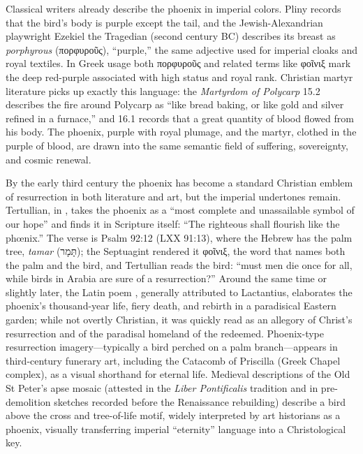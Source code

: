 Classical writers already describe the phoenix in imperial colors.
Pliny \cite[10.2]{pliny:nh} records that the bird's body is purple except the tail, and the Jewish-Alexandrian playwright Ezekiel the Tragedian (second century BC) \cite{ezekieldramatist:exagoge} describes its breast as \emph{porphyrous} (πορφυροῦς), ``purple,'' the same adjective used for imperial cloaks and royal textiles.
In Greek usage both πορφυροῦς and related terms like φοῖνιξ mark the deep red-purple associated with high status and royal rank.
Christian martyr literature picks up exactly this language: the \emph{Martyrdom of Polycarp} 15.2 describes the fire around Polycarp as ``like bread baking, or like gold and silver refined in a furnace,'' and 16.1 records that a great quantity of blood flowed from his body.
The phoenix, purple with royal plumage, and the martyr, clothed in the purple of blood, are drawn into the same semantic field of suffering, sovereignty, and cosmic renewal.

By the early third century the phoenix has become a standard Christian emblem of resurrection in both literature and art, but the imperial undertones remain.
Tertullian, in \cite[13]{tertullian:resurrection}, takes the phoenix as a ``most complete and unassailable symbol of our hope'' and finds it in Scripture itself: ``The righteous shall flourish like the phœnix.''
The verse is Psalm 92:12 (LXX 91:13), where the Hebrew has the palm tree, \emph{tamar} (\texthebrew{תָּמָר}); the Septuagint rendered it φοῖνιξ, the word that names both the palm and the bird, and Tertullian reads the bird: ``must men die once for all, while birds in Arabia are sure of a resurrection?''
Around the same time or slightly later, the Latin poem \cite{lactantius:phoenix}, generally attributed to Lactantius, elaborates the phoenix's thousand-year life, fiery death, and rebirth in a paradisical Eastern garden; while not overtly Christian, it was quickly read as an allegory of Christ's resurrection and of the paradisal homeland of the redeemed.
Phoenix-type resurrection imagery---typically a bird perched on a palm branch---appears in third-century funerary art, including the Catacomb of Priscilla (Greek Chapel complex), as a visual shorthand for eternal life.
Medieval descriptions of the Old St Peter's apse mosaic (attested in the \emph{Liber Pontificalis} tradition \cite{liberpontificalis} and in pre-demolition sketches recorded before the Renaissance rebuilding) describe a bird above the cross and tree-of-life motif, widely interpreted by art historians as a phoenix, visually transferring imperial ``eternity'' language into a Christological key.

